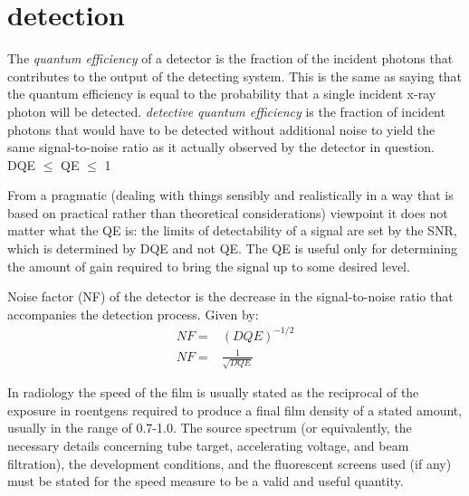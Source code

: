 \chapter{detection}
The \textit{quantum efficiency} of a detector is the fraction of the incident photons that contributes to the output of the detecting system.  This is the same as saying that the quantum efficiency is equal to the probability that a single incident x-ray photon will be detected.  
\textit{detective quantum efficiency} is the fraction of incident photons that would have to be detected without additional noise to yield the same signal-to-noise ratio as it actually observed by the detector in question.
DQE $\le$ QE $\le$ 1 \newline

From a pragmatic (dealing with things sensibly and realistically in a way that is based on practical rather than theoretical considerations) viewpoint it does not matter what the QE is: the limits of detectability of a signal are set by the SNR, which is determined by DQE and not QE.  The QE is useful only for determining the amount of gain required to bring the signal up to some desired level.

Noise factor (NF) of the detector is the decrease in the signal-to-noise ratio that accompanies the detection process. Given by:
\begin{equation}
\begin{split}
NF = &(DQE)^{-1/2} \\
NF = &\frac{1}{\sqrt{DQE}}
\end{split}
\end{equation}

In radiology the speed of the film is usually stated as the reciprocal of the exposure in roentgens required to produce a final film density of a stated amount, usually in the range of 0.7-1.0.  The source spectrum (or equivalently, the necessary details concerning tube target, accelerating voltage, and beam filtration), the development conditions, and the fluorescent screens used (if any) must be stated for the speed measure to be a valid and useful quantity.  

